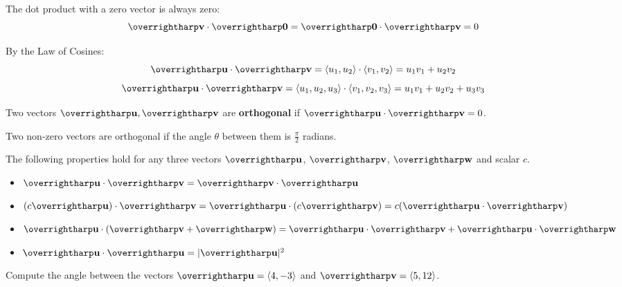\documentclass[letterpaper, twoside, 12pt]{book}
\begin{document}
\begin{definition}
  The dot product with a zero vector is always zero:
  \[\harpvec{v}\cdot\harpvec{0}=\harpvec{0}\cdot\harpvec{v}=0\]
\end{definition}

\begin{theorem}
By the Law of Cosines:
  \[
    \harpvec{u} \cdot \harpvec{v}
      =
    \<u_1,u_2\>\cdot\<v_1,v_2\>
      =
    u_1v_1 + u_2v_2
  \]
  \[
    \harpvec{u} \cdot \harpvec{v}
      =
    \<u_1,u_2,u_3\>\cdot\<v_1,v_2,v_3\>
      =
    u_1v_1 + u_2v_2 + u_3v_3
  \]
\end{theorem}

\begin{definition}
  Two vectors $\harpvec{u},\harpvec{v}$ are \textbf{orthogonal} if
  $\harpvec{u} \cdot \harpvec{v} = 0$.
\end{definition}

\begin{theorem}
  Two non-zero vectors are orthogonal if the angle $\theta$ between them
  is $\frac{\pi}{2}$ radians.
\end{theorem}

\begin{theorem}
The following properties hold for any three vectors $\harpvec{u}$, $\harpvec{v}$,
$\harpvec{w}$ and scalar $c$.
  \begin{itemize}
  \item $\harpvec{u} \cdot \harpvec{v} = \harpvec{v}\cdot\harpvec{u}$
  \item $(c\harpvec{u})\cdot \harpvec{v} = \harpvec{u} \cdot (c\harpvec{v}) = c(\harpvec{u} \cdot \harpvec{v})$
  \item $\harpvec{u} \cdot (\harpvec{v} + \harpvec{w}) = \harpvec{u}\cdot\harpvec{v} + \harpvec{u}\cdot \harpvec{w}$
  \item $\harpvec{u} \cdot \harpvec{u} = |\harpvec{u}|^2$
  \end{itemize}
\end{theorem}

          \begin{problem}
            Compute the angle between the vectors
            $\harpvec{u}=\<4,-3\>$ and $\harpvec{v}=\<5,12\>$.
          \end{problem}
\end{document}
